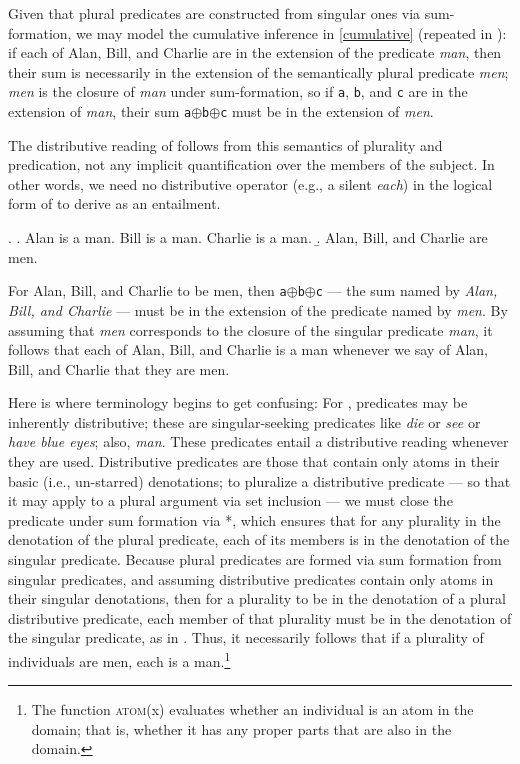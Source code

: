 \documentclass[linguex]{sp}
\renewcommand{\tt}{\texttt}
\newcommand{\op}{$\oplus$}
\begin{document}
Given that plural predicates are constructed from singular ones via sum-formation, we may model the cumulative inference in \ref{cumulative} (repeated in \Next): if each of Alan, Bill, and Charlie are in the extension of the predicate \emph{man}, then their sum is necessarily in the extension of the semantically plural predicate \emph{men}; \emph{men} is the closure of \emph{man} under sum-formation, so if \tt{a}, \tt{b}, and \tt{c} are in the extension of \emph{man}, their sum \tt{a}\op\tt{b}\op\tt{c} must be in the extension of \emph{men}.

The distributive reading of \Next[b] follows from this semantics of plurality and predication, not any implicit quantification over the members of the subject. In other words, we need no  distributive operator (e.g., a silent \emph{each}) in the logical form of \Next[b] to derive \Next[a] as an entailment.

\ex. \a. Alan is a man. Bill is a man. Charlie is a man.
\b. Alan, Bill, and Charlie are men.

For Alan, Bill, and Charlie to be men, then \tt{a}\op\tt{b}\op\tt{c} --- the sum named by \emph{Alan, Bill, and Charlie} --- must be in the extension of the predicate named by \emph{men}. By assuming that \emph{men} corresponds to the closure of the singular predicate \emph{man}, it follows that each of Alan, Bill, and Charlie is a man whenever we say of Alan, Bill, and Charlie that they are men.

Here is where terminology begins to get confusing: For \citeauthor{link1983}, predicates may be inherently distributive; these are singular-seeking predicates like \emph{die} or \emph{see} or \emph{have blue eyes}; also, \emph{man}. These predicates entail a distributive reading whenever they are used.
Distributive predicates are those that contain only atoms in their basic (i.e., un-starred) denotations; to pluralize a distributive predicate --- so that it may apply to a plural argument via set inclusion --- we must close the predicate under sum formation via *, which ensures that for any plurality in the denotation of the plural predicate, each of its members is in the denotation of the singular predicate. Because plural predicates are formed via sum formation from singular predicates, and assuming distributive predicates contain only atoms in their singular denotations, then for a plurality to be in the denotation of a plural distributive predicate, each member of that plurality must be in the denotation of the singular predicate, as in \Next. Thus, it necessarily follows that if a plurality of individuals are men, each is a man.\footnote{The function \textsc{atom}(x) evaluates whether an individual is an atom in the domain; that is, whether it has any proper parts that are also in the domain.}
\end{document}

